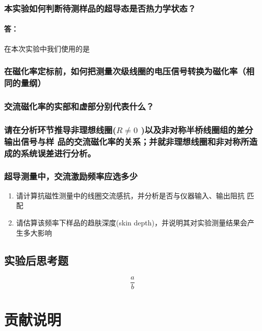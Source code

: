 \documentclass{ctexart}
\theoremstyle{ansstyle}
\begin{document}
\subsubsection{本实验如何判断待测样品的超导态是否热力学状态？ }
\paragraph{答：} 在本次实验中我们使用的是
\subsubsection{在磁化率定标前，如何把测量次级线圈的电压信号转换为磁化率（相同的量纲）}
\subsubsection{交流磁化率的实部和虚部分别代表什么？ }
\subsubsection{请在分析环节推导非理想线圈($ R\neq 0 $ )以及非对称半桥线圈组的差分输出信号与样
	品的交流磁化率的关系；并就非理想线圈和非对称所造成的系统误差进行分析。}
\subsubsection{超导测量中，交流激励频率应选多少}
\begin{enumerate}
	\item 请计算抗磁性测量中的线圈交流感抗，并分析是否与仪器输入、输出阻抗
	匹配
	\item 请估算该频率下样品的趋肤深度(skin depth)，并说明其对实验测量结果会产生多大影响
	
\end{enumerate}
\subsection{实验后思考题}


\appendix
\begin{equation}
	\dfrac{a}{b} 
\end{equation}

\section{贡献说明}
\end{document}
